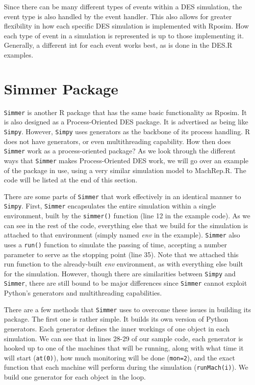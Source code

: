\documentclass[a4paper, 11pt]{article} %
\begin{document}
Since there can be many different types of events within a DES simulation, the event type is also handled by the event handler. This also allows for greater flexibility in how each specific DES simulation is implemented with Rposim. How each type of event in a simulation is represented is up to those implementing it. Generally, a different int for each event works best, as is done in the DES.R examples.





\section{Simmer Package}

\texttt{Simmer} is another R package that has the same basic functionality as Rposim. It is also designed as a Process-Oriented DES package. It is advertised as being like \texttt{Simpy}. However, \texttt{Simpy} uses generators as the backbone of its process handling. R does not have generators, or even multithreading capability. How then does \texttt{Simmer} work as a process-oriented package? As we look through the different ways that \texttt{Simmer} makes Process-Oriented DES work, we will go over an example of the package in use, using a very similar simulation model to MachRep.R. The code will be listed at the end of this section.

There are some parts of \texttt{Simmer} that work effectively in an identical manner to \texttt{Simpy}. First, \texttt{Simmer} encapsulates the entire simulation within a single environment, built by the \texttt{simmer()} function (line 12 in the example code). As we can see in the rest of the code, everything else that we build for the simulation is attached to that environment (simply named \textit{env} in the example). \texttt{Simmer} also uses a \texttt{run()} function to simulate the passing of time, accepting a number parameter to serve as the stopping point (line 35). Note that we attached this run function to the already-built \textit{env} environment, as with everything else built for the simulation. However, though there are similarities between \texttt{Simpy} and \texttt{Simmer}, there are still bound to be major differences since \texttt{Simmer} cannot exploit Python's generators and multithreading capabilities.

There are a few methods that \texttt{Simmer} uses to overcome these issues in building its package. The first one is rather simple. It builds its own version of Python generators. Each generator defines the inner workings of one object in each simulation. We can see that in lines 28-29 of our sample code, each generator is hooked up to one of the machines that will be running, along with what time it will start (\texttt{at(0)}), how much monitoring will be done (\texttt{mon=2}), and the exact function that each machine will perform during the simulation (\texttt{runMach(i)}). We build one generator for each object in the loop.
\end{document}

